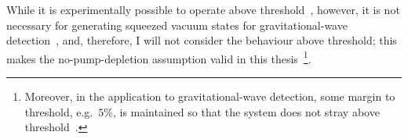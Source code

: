 While it is experimentally possible to operate above threshold~\cite{}, however, it is not necessary for generating squeezed vacuum states for gravitational-wave detection~\cite{}, and, therefore, I will not consider the behaviour above threshold; this makes the no-pump-depletion assumption valid in this thesis~\footnote{Moreover, in the application to gravitational-wave detection, some margin to threshold, e.g.\ $5\%$, is maintained so that the system does not stray above threshold~\cite{}.}.


